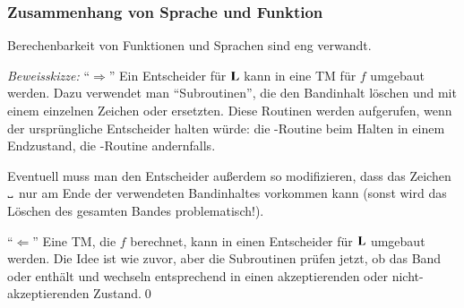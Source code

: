 \documentclass[onlymath]{beamer}
\begin{document}
\begin{frame}\frametitle{Zusammenhang von Sprache und Funktion}

Berechenbarkeit von Funktionen und Sprachen sind eng verwandt.

\pause

{\footnotesize
\emph{Beweisskizze:} "`$\Rightarrow$"' Ein Entscheider für $\textbf{\textcolor{black}{L}}$ kann in eine TM für $f$ umgebaut werden. Dazu verwendet man "`Subroutinen"', die den Bandinhalt löschen und mit einem einzelnen Zeichen  oder  ersetzten. Diese Routinen werden aufgerufen, wenn der ursprüngliche Entscheider halten würde: die -Routine beim Halten in einem Endzustand, die -Routine andernfalls.\medskip

{\tiny Eventuell muss man den Entscheider außerdem so modifizieren, dass das
Zeichen $\blank$ nur am Ende der verwendeten Bandinhaltes vorkommen kann (sonst wird das Löschen des gesamten Bandes problematisch!).

}
\smallskip

"`$\Leftarrow$"' Eine TM, die $f$ berechnet, kann in einen Entscheider für $\textbf{\textcolor{black}{L}}$ umgebaut werden. Die Idee ist wie zuvor, aber die Subroutinen prüfen jetzt, ob das Band  oder  enthält und wechseln entsprechend in einen akzeptierenden oder nicht-akzeptierenden Zustand.\qed

}

\end{frame}
\end{document}
